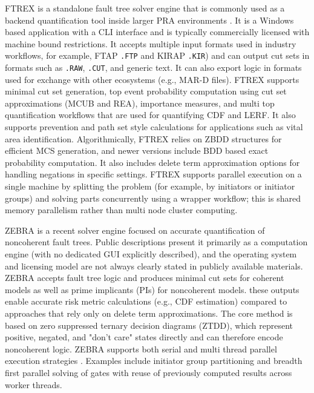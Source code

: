 FTREX \cite{ftrex_2008, ftrex_2009} is a standalone fault tree solver engine that is commonly used as a backend quantification tool inside larger PRA environments \cite{ftrex_2020}. It is a Windows based application with a CLI interface and is typically commercially licensed with machine bound restrictions. It accepts multiple input formats used in industry workflows, for example, FTAP \texttt{.FTP} and KIRAP \texttt{.KIR}) and can output cut sets in formats such as \texttt{.RAW}, \texttt{.CUT}, and generic text. It can also export logic in formats used for exchange with other ecosystems (e.g., MAR-D files). FTREX supports minimal cut set generation, top event probability computation using cut set approximations (MCUB and REA), importance measures, and multi top quantification workflows that are used for quantifying CDF and LERF. It also supports prevention and path set style calculations for applications such as vital area identification. Algorithmically, FTREX relies on ZBDD structures for efficient MCS generation, and newer versions include BDD based exact probability computation. It also includes delete term approximation options for handling negations in specific settings. FTREX supports parallel execution on a single machine by splitting the problem (for example, by initiators or initiator groups) and solving parts concurrently using a wrapper workflow; this is shared memory parallelism rather than multi node cluster computing.

ZEBRA \cite{zebra_2024} is a recent solver engine focused on accurate quantification of noncoherent fault trees. Public descriptions present it primarily as a computation engine (with no dedicated GUI explicitly described), and the operating system and licensing model are not always clearly stated in publicly available materials. ZEBRA accepts fault tree logic and produces minimal cut sets for coherent models as well as prime implicants (PIs) for noncoherent models. these outputs enable accurate risk metric calculations (e.g., CDF estimation) compared to approaches that rely only on delete term approximations. The core method is based on zero suppressed ternary decision diagrams (ZTDD), which represent positive, negated, and "don’t care" states directly and can therefore encode noncoherent logic. ZEBRA supports both serial and multi thread parallel execution strategies \cite{zebra_2025}. Examples include initiator group partitioning and breadth first parallel solving of gates with reuse of previously computed results across worker threads.


